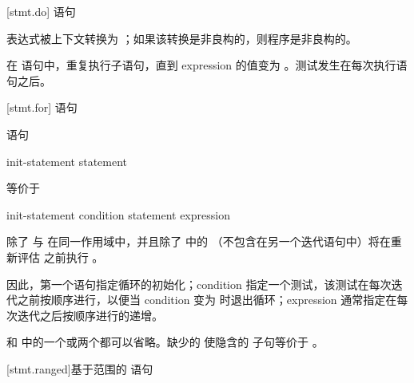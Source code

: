 [stmt.do]{  语句}%

\pnum
表达式被上下文转换为 ；如果该转换是非良构的，则程序是非良构的。

\pnum
在  语句中，重复执行子语句，直到 expression 的值变为 。测试发生在每次执行语句之后。

[stmt.for]{  语句}%

\pnum
{} 语句
\begin{ncsimplebnf}
 \terminal{(} init-statement  \terminal{;}  \terminal{)} statement
\end{ncsimplebnf}
等价于
\begin{ncsimplebnf}
\terminal{\{}\br
\bnfindent init-statement\br
\bnfindent {} \terminal{(} condition \terminal{)} \terminal{\{}\br
\bnfindent\bnfindent statement\br
\bnfindent\bnfindent expression \terminal{;}\br
\bnfindent \terminal{\}}\br
\terminal{\}}
\end{ncsimplebnf}
除了  与  在同一作用域中，并且除了  中的 （不包含在另一个迭代语句中）将在重新评估  之前执行 。
\begin{note}
因此，第一个语句指定循环的初始化；condition 指定一个测试，该测试在每次迭代之前按顺序进行，以便当 condition 变为  时退出循环；expression 通常指定在每次迭代之后按顺序进行的递增。
\end{note}

\pnum
{} 和  中的一个或两个都可以省略。缺少的  使隐含的  子句等价于 。

[stmt.ranged]{基于范围的  语句}%

